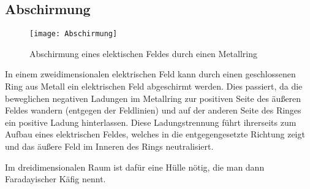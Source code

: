 




%
%	





\subsection{Abschirmung}

\begin{figure}[!h]
	\texttt{[image: Abschirmung]}
	\caption{Abschirmung eines elektischen Feldes durch einen Metallring}
	\label{fig:abschrimung}
\end{figure}

In einem zweidimensionalen elektrischen Feld kann durch einen geschlossenen Ring aus Metall ein elektrischen Feld abgeschirmt werden. Dies passiert, da die beweglichen negativen Ladungen im Metallring zur positiven Seite des äußeren Feldes wandern (entgegen der Feldlinien) und auf der anderen Seite des Ringes ein positive Ladung hinterlassen. Diese Ladungstrennung führt ihrerseits zum Aufbau eines elektrischen Feldes, welches in die entgegengesetzte Richtung zeigt und das \glqq äußere\grqq{} Feld im Inneren des Rings neutralisiert.

Im dreidimensionalen Raum ist dafür eine Hülle nötig, die man dann \glqq Faradayischer Käfig\grqq{} nennt.